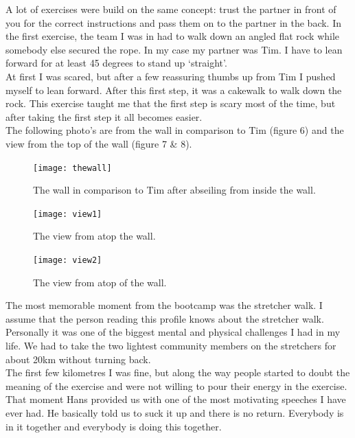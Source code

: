 \documentclass{article}
\begin{document}
A lot of exercises were build on the same concept: trust the partner in front of you for the correct instructions and pass them on to the partner in the back. In the first exercise, the team I was in had to walk down an angled flat rock while somebody else secured the rope. In my case my partner was Tim. I have to lean forward for at least 45 degrees to stand up `straight'.\\

At first I was scared, but after a few reassuring thumbs up from Tim I pushed myself to lean forward. After this first step, it was a cakewalk to walk down the rock. This exercise taught me that the first step is scary most of the time, but after taking the first step it all becomes easier.\\

The following photo's are from the wall in comparison to Tim (figure 6) and the view from the top of the wall (figure 7 \& 8).


\begin{figure}[!h]
	\centering
	\texttt{[image: thewall]}
	\label{fig:wall}
	\caption{The wall in comparison to Tim after abseiling from inside the wall.}
\end{figure}

\begin{figure}[!h]
	\centering
	\texttt{[image: view1]}
	\label{fig:view1}
	\caption{The view from atop the wall.}
\end{figure}
\begin{figure}[!h]
	\centering
	\texttt{[image: view2]}
	\label{fig:view2}
	\caption{The view from atop of the wall.}
\end{figure}

The most memorable moment from the bootcamp was the stretcher walk. I assume that the person reading this profile knows about the stretcher walk. Personally it was one of the biggest mental and physical challenges I had in my life. We had to take the two lightest community members on the stretchers for about 20km without turning back. \\

The first few kilometres I was fine, but along the way people started to doubt the meaning of the exercise and were not willing to pour their energy in the exercise. That moment Hans provided us with one of the most motivating speeches I have ever had. He basically told us to suck it up and there is no return. Everybody is in it together and everybody is doing this together. \\
\end{document}
